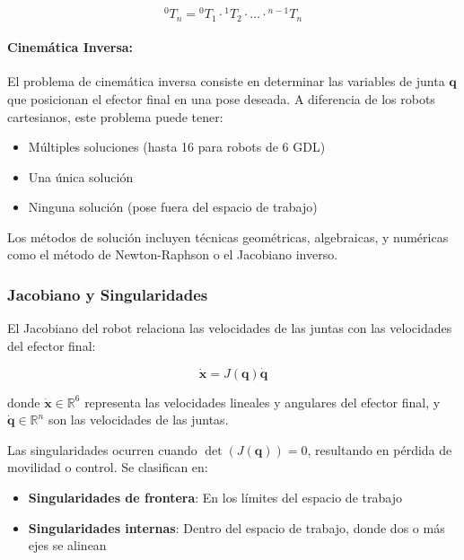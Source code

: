 \begin{equation}
{}^0T_n = {}^0T_1 \cdot {}^1T_2 \cdot \ldots \cdot {}^{n-1}T_n
\end{equation}

\paragraph{Cinemática Inversa:}

El problema de cinemática inversa consiste en determinar las variables de junta $\mathbf{q}$ que posicionan el efector final en una pose deseada. A diferencia de los robots cartesianos, este problema puede tener:

\begin{itemize}
    \item Múltiples soluciones (hasta 16 para robots de 6 GDL)
    \item Una única solución
    \item Ninguna solución (pose fuera del espacio de trabajo)
\end{itemize}

Los métodos de solución incluyen técnicas geométricas, algebraicas, y numéricas como el método de Newton-Raphson o el Jacobiano inverso.

\subsubsection{Jacobiano y Singularidades}

El Jacobiano del robot relaciona las velocidades de las juntas con las velocidades del efector final:

\begin{equation}
\dot{\mathbf{x}} = J(\mathbf{q}) \dot{\mathbf{q}}
\end{equation}

donde $\dot{\mathbf{x}} \in \mathbb{R}^6$ representa las velocidades lineales y angulares del efector final, y $\dot{\mathbf{q}} \in \mathbb{R}^n$ son las velocidades de las juntas.

Las singularidades ocurren cuando $\det(J(\mathbf{q})) = 0$, resultando en pérdida de movilidad o control. Se clasifican en:

\begin{itemize}
    \item \textbf{Singularidades de frontera}: En los límites del espacio de trabajo
    \item \textbf{Singularidades internas}: Dentro del espacio de trabajo, donde dos o más ejes se alinean
\end{itemize}

